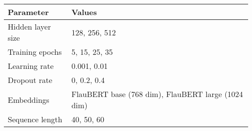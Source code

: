 
\begin{tabular}{ll}
\toprule
\textbf{Parameter} & \textbf{Values} \\
\midrule
Hidden layer size & 128, 256, 512 \\
Training epochs & 5, 15, 25, 35 \\
Learning rate & 0.001, 0.01 \\
Dropout rate & 0, 0.2, 0.4 \\
Embeddings & FlauBERT base (768 dim), FlauBERT large (1024 dim) \\
Sequence length & 40, 50, 60\\
\bottomrule
\end{tabular}